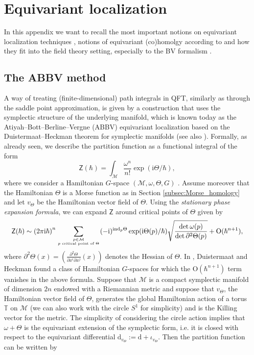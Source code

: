 \documentclass[11pt,colorinlistoftodos]{amsart}
\numberwithin{equation}{subsection}
\theoremstyle{plain}
\theoremstyle{definition}
\theoremstyle{remark}
\newcommand{\dd}{{\mathrm{d}}}
\newcommand{\de}{\partial}
\newcommand{\calM}{\mathcal{M}}
\newcommand{\I}{\mathrm{i}}
\begin{document}
\appendix

\section{Equivariant localization}
\label{app:Equivariant_localization}
In this appendix we want to recall the most important notions on equivariant localization techniques \cite{Szabo2000,BerlineVergne1982,BerlineVergne1983}, notions of equivariant (co)homolgy according to \cite{AtiyahBott1984} and how they fit into the field theory setting, especially to the BV formalism \cite{Neressian1993,Szabo2000}.

\subsection{The ABBV method}
A way of treating (finite-dimensional) path integrals in QFT, similarly as through the saddle point approximation, is given by a construction that uses the symplectic structure of the underlying manifold, which is known today as the Atiyah--Bott--Berline--Vergne (ABBV) equivariant localization \cite{AtiyahBott1984,BerlineVergne1982,BerlineVergne1983} based on the Duistermaat--Heckman theorem \cite{DuistermaatHeckman1982} for symplectic manifolds (see also \cite{Szabo2000}). Formally, as already seen, we describe the partition function as a functional integral of the form 
\[
\mathsf{Z}(\hbar)=\int_\calM \frac{\omega^n}{n!}\exp(\I \Theta/\hbar),
\]
where we consider a Hamiltonian $G$-space $(\calM,\omega,\Theta,G)$ . Assume moreover that the Hamiltonian $\Theta$ is a Morse function as in Section \ref{subsec:Morse_homology} and let $v_\Theta$ be the Hamiltonian vector field of $\Theta$. Using the \emph{stationary phase expansion formula}, we can expand $\mathsf{Z}$ around critical points of $\Theta$ given by 
\[
\mathsf{Z}(\hbar)\sim\left(2\pi\I\hbar\right)^n\sum_{p\in\calM\atop\text{$p$ critical point of $\Theta$}}(-\I)^{\mathrm{ind}_p\Theta}\exp(\I \Theta(p)/\hbar)\sqrt{\frac{\det \omega(p)}{\det \de^2\Theta(p)}}+\mathrm{O}(\hbar^{n+1}),
\]
where $\de^2\Theta(x)=\left(\frac{\de^2 \Theta}{\de x^i\de x^j}(x)\right)$ denotes the Hessian of $\Theta$.
In \cite{DuistermaatHeckman1982}, Duistermaat and Heckman found a class of Hamiltonian $G$-spaces for which the $\mathrm{O}(\hbar^{n+1})$ term vanishes in the above formula. Suppose that $\calM$ is a compact symplectic manifold of dimension $2n$ endowed with a Riemannian metric and suppose that $v_\Theta$, the Hamiltonian vector field of $\Theta$, generates the global Hamiltonian action of a torus $\mathbb{T}$ on $\calM$ (we can also work with the circle $S^1$ for simplicity) and is the Killing vector for the metric. The simplicity of considering the circle action implies that $\omega+\Theta$ is the equivariant extension of the symplectic form, i.e. it is closed with respect to the equivariant differential $\dd_{v_\Theta}:=\dd+\iota_{v_\Theta}$. Then the partition function can be written by 
\end{document}
